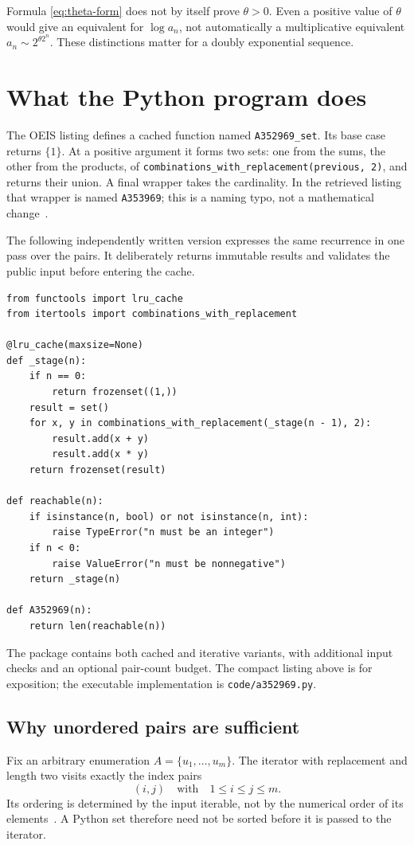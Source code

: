 \documentclass[11pt,a4paper]{article}
\theoremstyle{definition}
\theoremstyle{remark}
\begin{document}
Formula \eqref{eq:theta-form} does not by itself prove $\theta>0$.
Even a positive value of $\theta$ would give an equivalent for $\log a_n$,
not automatically a multiplicative equivalent
$a_n\sim2^{\theta2^n}$. These distinctions matter for a doubly exponential
sequence.

\section{What the Python program does}\label{sec:program}
The OEIS listing defines a cached function named \texttt{A352969\_set}.
Its base case returns $\{1\}$. At a positive argument it forms two sets:
one from the sums, the other from the products, of
\texttt{combinations\_with\_replacement(previous, 2)}, and returns their
union. A final wrapper takes the cardinality. In the retrieved listing
that wrapper is named \texttt{A353969}; this is a naming typo, not a
mathematical change~\cite{oeis}.

The following independently written version expresses the same recurrence
in one pass over the pairs. It deliberately returns immutable results and
validates the public input before entering the cache.
\begin{lstlisting}
from functools import lru_cache
from itertools import combinations_with_replacement

@lru_cache(maxsize=None)
def _stage(n):
    if n == 0:
        return frozenset((1,))
    result = set()
    for x, y in combinations_with_replacement(_stage(n - 1), 2):
        result.add(x + y)
        result.add(x * y)
    return frozenset(result)

def reachable(n):
    if isinstance(n, bool) or not isinstance(n, int):
        raise TypeError("n must be an integer")
    if n < 0:
        raise ValueError("n must be nonnegative")
    return _stage(n)

def A352969(n):
    return len(reachable(n))
\end{lstlisting}
The package contains both cached and iterative variants, with additional
input checks and an optional pair-count budget. The compact listing above
is for exposition; the executable implementation is
\texttt{code/a352969.py}.

\subsection{Why unordered pairs are sufficient}
Fix an arbitrary enumeration $A=\{u_1,\ldots,u_m\}$.
The iterator with replacement and length two visits exactly the index pairs
\[
 (i,j)\quad\text{with}\quad1\le i\le j\le m.
\]
Its ordering is determined by the input iterable, not by the numerical
order of its elements~\cite{itertools}. A Python set therefore need not be
sorted before it is passed to the iterator.
\end{document}
